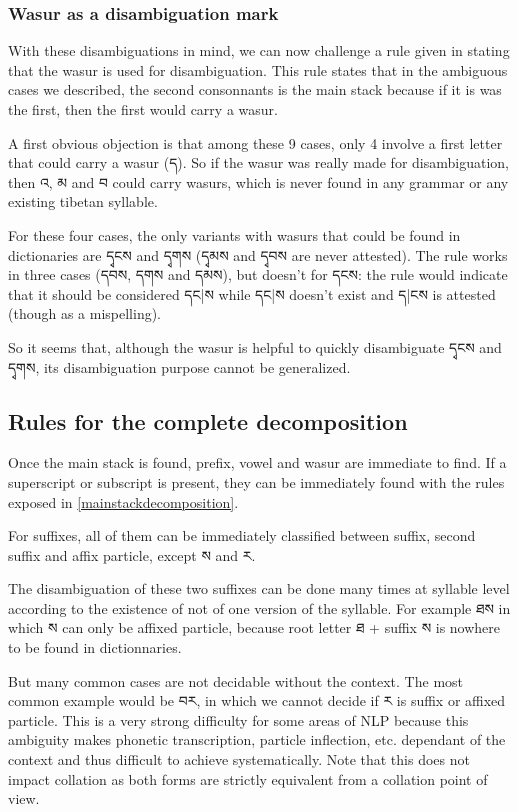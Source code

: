 \documentclass[%
a4paper,%
pagesize,%
12pt,%
parskip=off,%
bibliography=totoc,%
numbers=noenddot,%
DIV=12,%
twoside=semi,%
headings=normal%
]{scrartcl}
\begin{document}
\subsubsection*{Wasur as a disambiguation mark}\label{wasurdisambiguation}

With these disambiguations in mind, we can now challenge a rule given in \cite{MugeGrammar} stating that the wasur is used for disambiguation. This rule states that in the ambiguous cases we described, the second consonnants is the main stack because if it is was the first, then the first would carry a wasur.

A first obvious objection is that among these 9 cases, only 4 involve a first letter that could carry a wasur (ད). So if the wasur was really made for disambiguation, then འ, མ and བ could carry wasurs, which is never found in any grammar or any existing tibetan syllable.

For these four cases, the only variants with wasurs that could be found in dictionaries are དྭངས and དྭགས (དྭམས and དྭབས are never attested). The rule works in three cases (དབས, དགས and དམས), but doesn't for དངས: the rule would indicate that it should be considered དང|ས while དང|ས doesn't exist and ད|ངས is attested (though as a mispelling).

So it seems that, although the wasur is helpful to quickly disambiguate དྭངས and དྭགས, its disambiguation purpose cannot be generalized.

\subsection{Rules for the complete decomposition}

Once the main stack is found, prefix, vowel and wasur are immediate to find. If a superscript or subscript is present, they can be immediately found with the rules exposed in \ref{mainstackdecomposition}.

For suffixes, all of them can be immediately classified between suffix, second suffix and affix particle, except ས and ར. 

The disambiguation of these two suffixes can be done many times at syllable level according to the existence of not of one version of the syllable. For example ཐས in which ས can only be affixed particle, because root letter ཐ + suffix ས is nowhere to be found in dictionnaries. 

But many common cases are not decidable without the context. The most common example would be བར, in which we cannot decide if ར is suffix or affixed particle. This is a very strong difficulty for some areas of NLP because this ambiguity makes phonetic transcription, particle inflection, etc. dependant of the context and thus difficult to achieve systematically. Note that this does not impact collation as both forms are strictly equivalent from a collation point of view.
\end{document}
